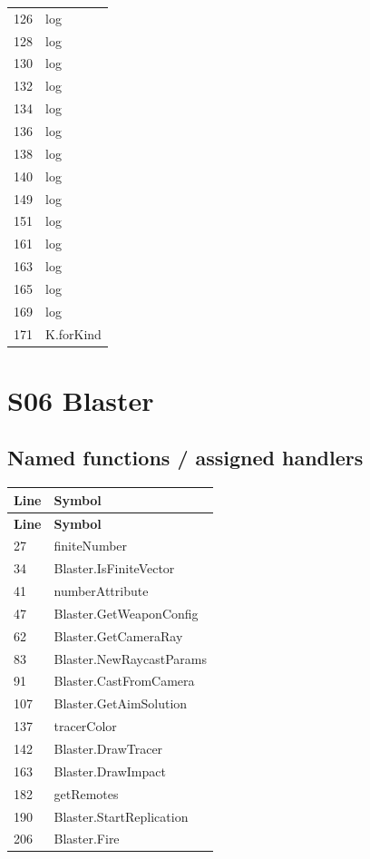 \begin{longtable}{p{}p{}}
126 & log \\
128 & log \\
130 & log \\
132 & log \\
134 & log \\
136 & log \\
138 & log \\
140 & log \\
149 & log \\
151 & log \\
161 & log \\
163 & log \\
165 & log \\
169 & log \\
171 & K.\allowbreak{}forKind \\
\bottomrule
\end{longtable}
\section{S06 Blaster}
\subsection{Named functions /\allowbreak{} assigned handlers}
\begin{longtable}{p{}p{}}
\toprule
\textbf{Line} & \textbf{Symbol} \\ \midrule
\endfirsthead
\textbf{Line} & \textbf{Symbol} \\ \midrule
\endhead
27 & finiteNumber \\
34 & Blaster.\allowbreak{}IsFiniteVector \\
41 & numberAttribute \\
47 & Blaster.\allowbreak{}GetWeaponConfig \\
62 & Blaster.\allowbreak{}GetCameraRay \\
83 & Blaster.\allowbreak{}NewRaycastParams \\
91 & Blaster.\allowbreak{}CastFromCamera \\
107 & Blaster.\allowbreak{}GetAimSolution \\
137 & tracerColor \\
142 & Blaster.\allowbreak{}DrawTracer \\
163 & Blaster.\allowbreak{}DrawImpact \\
182 & getRemotes \\
190 & Blaster.\allowbreak{}StartReplication \\
206 & Blaster.\allowbreak{}Fire \\
\bottomrule
\end{longtable}
